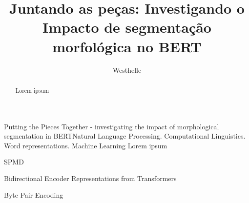 \documentclass[cic,tc]{iiufrgs}
\title{Juntando as peças: Investigando o Impacto de segmentação morfológica no BERT}
\author{Westhelle}{Matheus}
\begin{document}
\maketitle





\begin{abstract}
    Lorem ipsum
\end{abstract}

\begin{englishabstract}{Putting the Pieces Together - investigating the impact of morphological segmentation in BERT}{Natural Language Processing. Computational Linguistics. Word representations. Machine Learning}
    Lorem ipsum
\end{englishabstract}

\listoffigures

\listoftables

\begin{listofabbrv}{SPMD}
    \item[BERT] Bidirectional Encoder Representations from Transformers
    \item[BPE] Byte Pair Encoding
\end{listofabbrv}

\end{document}
